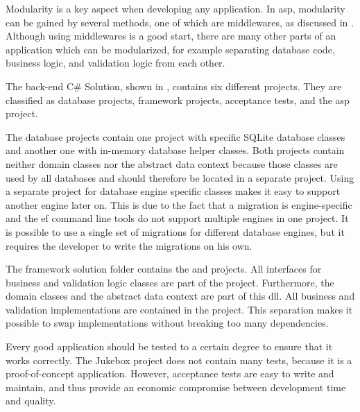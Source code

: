 Modularity is a key aspect when developing any application. In \gls{asp}, modularity can be gained by several methods, one of which are middlewares, as discussed in . Although using middlewares is a good start, there are many other parts of an application which can be modularized, for example separating database code, business logic, and validation logic from each other.


The back-end C\# Solution, shown in , contains six different projects. They are classified as database projects, framework projects, acceptance tests, and the \gls{asp} project.

The database projects contain one project with specific SQLite database classes and another one with in-memory database helper classes. Both projects contain neither domain classes nor the abstract data context because those classes are used by all databases and should therefore be located in a separate project. Using a separate project for database engine specific classes makes it easy to support another engine later on. This is due to the fact that a migration is engine-specific and the \gls{ef} command line tools do not support multiple engines in one project. It is possible to use a single set of migrations for different database engines, but it requires the developer to write the migrations on his own.

The framework solution folder contains the  and  projects. All interfaces for business and validation logic classes are part of the  project. Furthermore, the domain classes and the abstract data context are part of this \gls{dll}. All business and validation implementations are contained in the  project. This separation makes it possible to swap implementations without breaking too many dependencies.



Every good application should be tested to a certain degree to ensure that it works correctly. The Jukebox project does not contain many tests, because it is a proof-of-concept application. However, acceptance tests are easy to write and maintain, and thus provide an economic compromise between development time and quality.

